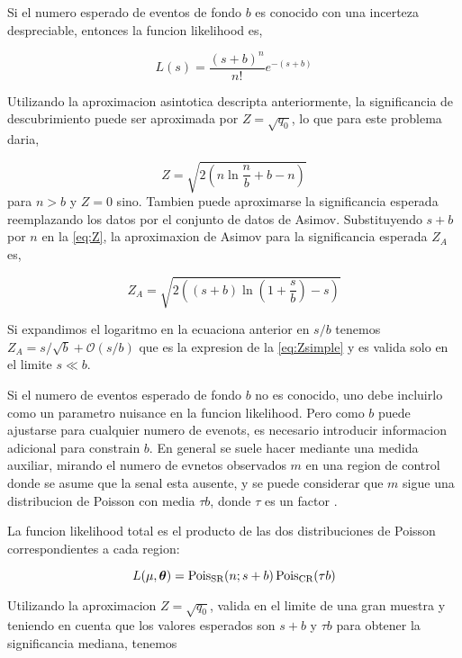 Si el numero esperado de eventos de fondo $b$ es conocido con una incerteza despreciable,
entonces la funcion likelihood es,

\begin{equation}
  L(s) = \frac{(s+b)^n}{n!} e^{-(s+b)}
\end{equation}

Utilizando la aproximacion asintotica descripta anteriormente, la significancia de descubrimiento
puede ser aproximada por $Z=\sqrt{q_0}$, lo que para este problema daria,

\begin{equation}
  Z = \sqrt{2\left( n \ln \frac{n}{b} +b -n \right)}
  \label{eq:Z}
\end{equation}
%
para $n>b$ y $Z=0$ sino. Tambien puede aproximarse la significancia esperada reemplazando los datos
por el conjunto de datos de Asimov. Substituyendo $s+b$ por $n$ en la {\eq} \eqref{eq:Z}, la aproximaxion de
Asimov para la significancia esperada $Z_A$ es,

\begin{equation}
  Z_A = \sqrt{2\left( (s+b) \ln \left( 1 + \frac{s}{b}\right) - s \right)}
\end{equation}

Si expandimos el logaritmo en la ecuaciona anterior en $s/b$ tenemos $Z_A = s/\sqrt{b} + \mathcal{O}(s/b)$
que es la expresion de la {\eq} \eqref{eq:Zsimple} y es valida solo en el limite $s \ll b$.

Si el numero de eventos esperado de fondo $b$ no es conocido, uno debe incluirlo como
un parametro nuisance en la funcion likelihood. Pero como $b$ puede ajustarse para cualquier
numero de evenots, es necesario introducir informacion adicional para constrain $b$. En general
se suele hacer mediante una medida auxiliar, mirando el numero de evnetos observados $m$ en una
region de control donde se asume que la senal esta ausente, y se puede considerar que $m$ sigue
una distribucion de Poisson con media $\tau b$, donde $\tau$ es un factor .

La funcion likelihood total es el producto de las dos distribuciones de Poisson correspondientes
a cada region:

\begin{equation}
  L(\mu, \bm{\theta}) = \operatorname{Pois}_\text{SR}(n;s+b) \operatorname{Pois}_\text{CR}(\tau b)
\end{equation}

Utilizando la aproximacion $Z = \sqrt{q_0}$, valida en el limite de una gran muestra y
teniendo en cuenta que los valores esperados son $s+b$ y $\tau b$ para obtener la significancia
mediana, tenemos

